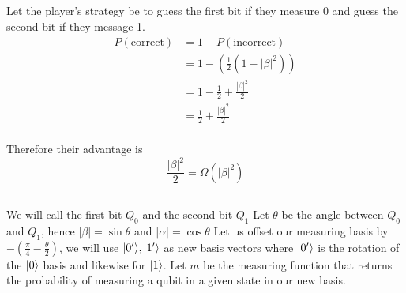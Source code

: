 \subsection{}
Let the player's strategy be to guess the first bit if they measure 0 and guess the second bit if they message 1.
\begin{align*}
    P(\text{correct}) &= 1-P(\text{incorrect})\\
        &= 1-(\frac{1}{2}(1-|\beta|^2))\\
        &= 1-\frac{1}{2} + \frac{|\beta|^2}{2}\\
        &= \frac{1}{2} + \frac{|\beta|^2}{2}\\
\end{align*}

Therefore their advantage is 
\[\frac{|\beta|^2}{2} = \Omega(|\beta|^2)\]


\subsection{}
We will call the first bit $Q_0$ and the second bit $Q_1$
Let $\theta$ be the angle between $Q_0$ and $Q_1$, hence $|\beta|=\sin \theta$ and $|\alpha|= \cos \theta$
Let us offset our measuring basis by $-(\frac{\pi}{4}-\frac{\theta}{2})$, we will use $\lvert0'\rangle,\lvert1'\rangle$ as new basis vectors where $\lvert0'\rangle$ is the rotation of the $\lvert0\rangle$ basis and likewise for $\lvert1\rangle$.
Let $m$ be the measuring function that returns the probability of measuring a qubit in a given state in our new basis.

